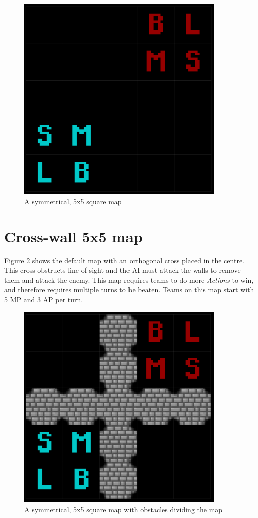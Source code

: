 \documentclass[11pt, a4paper]{report}
\begin{document}
\begin{appendices}
\begin{figure}[!h]
  \centering
  \includegraphics[width=10cm]{img/map_default_5x5.png}
  \caption{A symmetrical, 5x5 square map}
  \label{fig:mapDefault5x5}
\end{figure}

\pagebreak
\section{Cross-wall 5x5 map}
\label{sec:mapCrossWall5x5}

Figure \ref{fig:mapWithCrossWalls5x5} shows the default map with an orthogonal cross placed in the centre. This cross obstructs line of sight and the AI must attack the walls to remove them and attack the enemy. This map requires teams to do more \emph{Actions} to win, and therefore requires multiple turns to be beaten. Teams on this map start with 5 MP and 3 AP per turn.

\begin{figure}[!h]
  \centering
  \includegraphics[width=10cm]{img/map_cross_wall_5x5.png}
  \caption{A symmetrical, 5x5 square map with obstacles dividing the map}
  \label{fig:mapWithCrossWalls5x5}
\end{figure}


\end{appendices}
\end{document}
